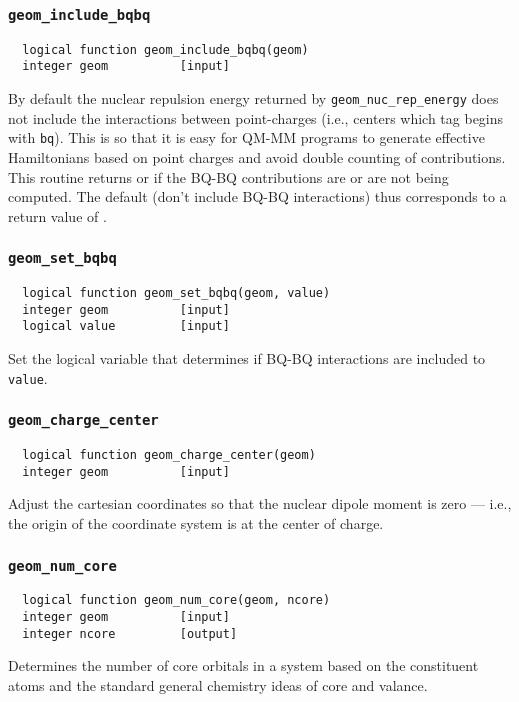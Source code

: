\subsubsection{{\tt geom\_include\_bqbq}}
\begin{verbatim}
  logical function geom_include_bqbq(geom)
  integer geom          [input]
\end{verbatim}
By default the nuclear repulsion energy returned by
\verb+geom_nuc_rep_energy+ does not include the interactions between
point-charges (i.e., centers which tag begins with \verb+bq+).  This
is so that it is easy for QM-MM programs to generate effective
Hamiltonians based on point charges and avoid double counting of
contributions.  This routine returns \TRUE or \FALSE
if the BQ-BQ contributions are or are not being computed.  The default
(don't include BQ-BQ interactions) thus corresponds to a return value
of \FALSE.

\subsubsection{{\tt geom\_set\_bqbq}}
\begin{verbatim}
  logical function geom_set_bqbq(geom, value)
  integer geom          [input]
  logical value         [input]
\end{verbatim}
Set the logical variable that determines if BQ-BQ interactions are
included to {\tt value}.


\subsubsection{{\tt geom\_charge\_center}}
\begin{verbatim}
  logical function geom_charge_center(geom)
  integer geom          [input]
\end{verbatim}
Adjust the cartesian coordinates so that the nuclear dipole moment is
zero --- i.e., the origin of the coordinate system is at the center of
charge.

\subsubsection{{\tt geom\_num\_core}}
\begin{verbatim}
  logical function geom_num_core(geom, ncore)
  integer geom          [input]
  integer ncore         [output]
\end{verbatim}
Determines the number of core orbitals in a system based on the
constituent atoms and the standard general chemistry ideas of core and
valance.

